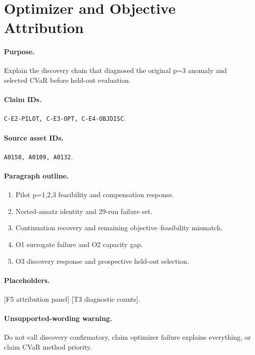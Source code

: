 \section{Optimizer and Objective Attribution}

\paragraph{Purpose.}
Explain the discovery chain that diagnosed the original p=3 anomaly and selected
CVaR before held-out evaluation.

\paragraph{Claim IDs.}
\texttt{C-E2-PILOT, C-E3-OPT, C-E4-OBJDISC}.

\paragraph{Source asset IDs.}
\texttt{A0158, A0109, A0132}.

\paragraph{Paragraph outline.}
\begin{enumerate}
  \item Pilot p=1,2,3 feasibility and compensation response.
  \item Nested-ansatz identity and 29-run failure set.
  \item Continuation recovery and remaining objective--feasibility mismatch.
  \item O1 surrogate failure and O2 capacity gap.
  \item O3 discovery response and prospective held-out selection.
\end{enumerate}

\paragraph{Placeholders.}
[F5 attribution panel] [T3 diagnostic counts].

\paragraph{Unsupported-wording warning.}
Do not call discovery confirmatory, claim optimizer failure explains everything,
or claim CVaR method priority.
